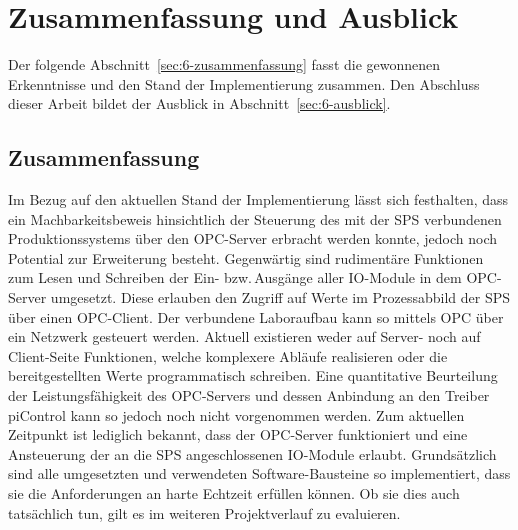 % 
% 
% 
% 
% 
% 
% 

\section{Zusammenfassung und Ausblick%
  \label{sec:6-fazit}}
Der folgende Abschnitt~\ref{sec:6-zusammenfassung} fasst die gewonnenen Erkenntnisse und den Stand der Implementierung zusammen.
Den Abschluss dieser Arbeit bildet der Ausblick in Abschnitt~\ref{sec:6-ausblick}.

\subsection{Zusammenfassung%
     \label{sec:6-zusammenfassung}}
Im Bezug auf den aktuellen Stand der Implementierung lässt sich festhalten, dass ein Machbarkeitsbeweis hinsichtlich der Steuerung des mit der SPS verbundenen Produktionssystems über den OPC-Server erbracht werden konnte, jedoch noch Potential zur Erweiterung besteht. 
Gegenwärtig sind rudimentäre Funktionen zum Lesen und Schreiben der Ein- bzw.\,Ausgänge aller IO-Module in dem OPC-Server umgesetzt. 
Diese erlauben den Zugriff auf Werte im Prozessabbild der SPS über einen OPC-Client.
Der verbundene Laboraufbau kann so mittels OPC über ein Netzwerk gesteuert werden.
Aktuell existieren weder auf Server- noch auf Client-Seite Funktionen, welche komplexere Abläufe realisieren 
oder die bereitgestellten Werte programmatisch schreiben.
Eine quantitative Beurteilung der Leistungsfähigkeit des OPC-Servers und dessen Anbindung an den Treiber piControl kann
so jedoch noch nicht vorgenommen werden.
Zum aktuellen Zeitpunkt ist lediglich bekannt, dass der OPC-Server funktioniert und eine Ansteuerung der an die 
SPS angeschlossenen IO-Module erlaubt.
Grundsätzlich sind alle umgesetzten und verwendeten Software-Bausteine so implementiert, dass sie die Anforderungen
an harte Echtzeit erfüllen können. Ob sie dies auch tatsächlich tun, gilt es im weiteren Projektverlauf zu evaluieren.

